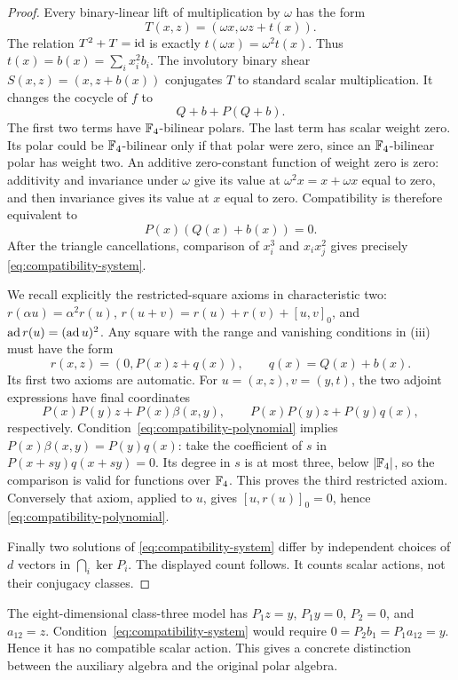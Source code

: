 \begin{proof}
Every binary-linear lift of multiplication by \(\omega\) has the form
\[
 T(x,z)=(\omega x,\omega z+t(x)).
\]
The relation \(T^2+T=\operatorname{id}\) is exactly
\(t(\omega x)=\omega^2t(x)\). Thus
\(t(x)=b(x)=\sum_i x_i^2b_i\).
The involutory binary shear \(S(x,z)=(x,z+b(x))\) conjugates \(T\)
to standard scalar multiplication. It changes the cocycle of \(f\) to
\[
 Q+b+P(Q+b).
\]
The first two terms have \(\mathbb F_4\)-bilinear polars. The last term has
scalar weight zero. Its polar could be \(\mathbb F_4\)-bilinear only if that
polar were zero, since an \(\mathbb F_4\)-bilinear polar has weight two.
An additive zero-constant function of weight zero is zero: additivity
and invariance under \(\omega\) give its value at \(\omega^2x=x+\omega x\)
equal to zero, and then invariance gives its value at \(x\) equal to zero.
Compatibility is therefore equivalent to
\begin{equation}\label{eq:compatibility-polynomial}
 P(x)(Q(x)+b(x))=0.
\end{equation}
After the triangle cancellations, comparison of \(x_i^3\) and
\(x_ix_j^2\) gives precisely \eqref{eq:compatibility-system}.

We recall explicitly the restricted-square axioms in characteristic two:
\(r(\alpha u)=\alpha^2r(u)\),
\(r(u+v)=r(u)+r(v)+[u,v]_0\), and
\(\operatorname{ad} r(u)=(\operatorname{ad} u)^2\).
Any square with the range and vanishing conditions in (iii) must have
the form
\begin{equation}\label{eq:restricted-square}
 r(x,z)=(0,P(x)z+q(x)),\qquad q(x)=Q(x)+b(x).
\end{equation}
Its first two axioms are automatic. For \(u=(x,z),v=(y,t)\), the two
adjoint expressions have final coordinates
\[
 P(x)P(y)z+P(x)\beta(x,y),\qquad
 P(x)P(y)z+P(y)q(x),
\]
respectively. Condition~\eqref{eq:compatibility-polynomial} implies
\(P(x)\beta(x,y)=P(y)q(x)\): take the coefficient of \(s\) in
\(P(x+sy)q(x+sy)=0\). Its degree in \(s\) is at most three, below
\(|\mathbb F_4|\), so the comparison is valid for functions over \(\mathbb F_4\).
This proves the third restricted axiom. Conversely that axiom, applied
to \(u\), gives \([u,r(u)]_0=0\), hence
\eqref{eq:compatibility-polynomial}.

Finally two solutions of \eqref{eq:compatibility-system} differ by
independent choices of \(d\) vectors in \(\bigcap_i\ker P_i\).
The displayed count follows. It counts scalar actions, not their
conjugacy classes.
\end{proof}

\begin{example}\label{ex:incompatible-eight}
The eight-dimensional class-three model has
\(P_1z=y\), \(P_1y=0\), \(P_2=0\), and \(a_{12}=z\).
Condition~\eqref{eq:compatibility-system} would require
\(0=P_2b_1=P_1a_{12}=y\). Hence it has no compatible scalar action.
This gives a concrete distinction between the auxiliary algebra and
the original polar algebra.
\end{example}

